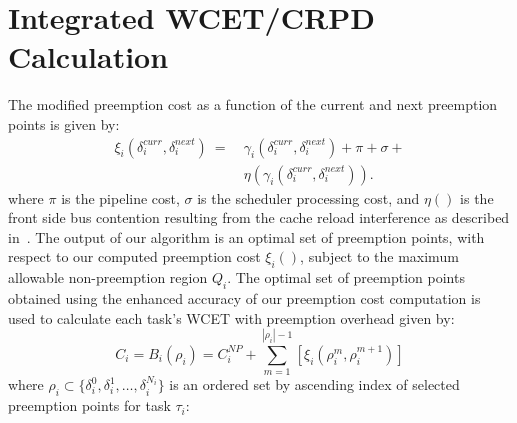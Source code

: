 \vspace{-10pt}
\section{Integrated WCET/CRPD Calculation}\label{sec:schedulability_analysis}

The modified preemption cost as a function of the current and next preemption points is given by:
\begin{equation}\label{eqn:prempt-cost}
\begin{split}
    \xi_{i}(\delta_{i}^{curr},\delta_{i}^{next})\ =\ &\gamma_{i}(\delta_{i}^{curr},\delta_{i}^{next}) + \pi + \sigma + \\ &\eta(\gamma_{i}(\delta_{i}^{curr},\delta_{i}^{next})).
\end{split}
\end{equation}
%
\noindent
where \begin{math}\pi\end{math} is the pipeline cost, \begin{math}\sigma\end{math} is the scheduler processing cost, and \begin{math}\eta()\end{math} is the front side bus contention resulting from the cache reload interference as described in~\cite{pellizzoni:07,pellizzoni:08,pellizzoni:11}.
%
The output of our algorithm is an optimal set of preemption points, with respect to our computed preemption cost $\xi_i()$, subject to the maximum allowable non-preemption region \begin{math}Q_{i}\end{math}.  The optimal set of preemption points obtained using the enhanced accuracy of our preemption cost computation is used to calculate each task's WCET with preemption overhead given by:
\begin{equation}\label{eqn:wcet-cost}
   C_{i} = B_{i}(\rho_{i}) = C_{i}^{NP} + \sum_{m=1}^{|\rho_{i}|-1} [\xi_{i}(\rho_{i}^{m},\rho_{i}^{m+1})]
\end{equation}
\noindent
where $\rho_i \subset \{\delta_i^0, \delta_i^1,  \ldots, \delta_i^{N_i}\}$ is an ordered set by ascending index of selected preemption points for task \begin{math}\tau_{i}\end{math}:
